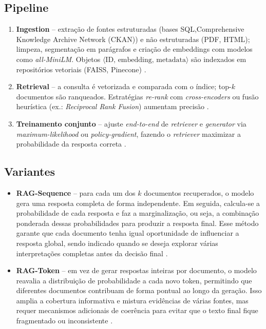 \begin{description}
\subsection{Pipeline}
\label{sec:rag:pipeline}
\begin{enumerate}[label=\arabic*.]
  \item \textbf{Ingestion} – extração de fontes estruturadas (bases SQL,Comprehensive Knowledge Archive Network (CKAN))
        e não estruturadas (PDF, HTML); limpeza, segmentação em parágrafos e
        criação de embeddings com modelos como \textit{all-MiniLM}.
        Objetos $\langle\text{ID},\,\text{embedding},\,\text{metadata}\rangle$
        são indexados em repositórios vetoriais (FAISS, Pinecone)
        \cite{qwak2024integrating,taipalus2024vector}.
  \item \textbf{Retrieval} – a consulta é vetorizada e comparada com o índice;
        top-$k$ documentos são ranqueados. Estratégias \emph{re-rank} com
        \textit{cross-encoders} ou fusão heurística (ex.: \textit{Reciprocal
        Rank Fusion}) aumentam precisão \cite{edwards2024hybrid}.
  \item \textbf{Treinamento conjunto} – ajuste \textit{end-to-end} de
        \textit{retriever} e \textit{generator} via
        \textit{maximum-likelihood} ou \textit{policy-gradient}, fazendo o
        \textit{retriever} maximizar a probabilidade da resposta correta
        \cite{zhang2025fine}.
\end{enumerate}

\subsection{Variantes}
\begin{itemize}
  \item \textbf{RAG-Sequence} – para cada um dos $k$ documentos recuperados, o modelo gera uma resposta completa de forma independente. Em seguida, calcula-se a probabilidade de cada resposta e faz a marginalização, ou seja, a combinação ponderada dessas probabilidades para produzir a resposta final. Esse método garante que cada documento tenha igual oportunidade de influenciar a resposta global, sendo indicado quando se deseja explorar várias interpretações completas antes da decisão final \cite{lewis2020rag,edwards2024hybrid}.
  \item \textbf{RAG-Token} – em vez de gerar respostas inteiras por documento, o modelo reavalia a distribuição de probabilidade a cada novo token, permitindo que diferentes documentos contribuam de forma pontual ao longo da geração. Isso amplia a cobertura informativa e mistura evidências de várias fontes, mas requer mecanismos adicionais de coerência para evitar que o texto final fique fragmentado ou inconsistente \cite{zhang2025fine}.
\end{itemize}


\end{description}
